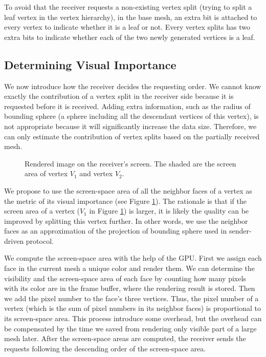      To avoid that the receiver requests a non-existing vertex split (trying to split
     a leaf vertex in the vertex hierarchy),
     in the base mesh, an extra bit is attached to every vertex to indicate whether it is a leaf or not.
     Every vertex splits has two extra bits to indicate whether each of the two newly generated vertices 
     is a leaf.
     \subsection{Determining Visual Importance}
     \label{ss:dstream:visual}
     We now introduce how the receiver decides the requesting order. 
     We cannot know exactly the contribution of a vertex split in the receiver side
     because it is requested before it is received.
     Adding extra information, such as the radius of bounding sphere (a sphere including all the 
     descendant vertices of this vertex), is not appropriate
     because it will significantly increase the data size. 
     Therefore, we can only estimate the contribution of vertex splits based on the 
     partially received mesh.
     
    \begin{figure}
    \centering
    \caption[Screen area]{Rendered image on the receiver's screen. 
    The shaded are the screen area of vertex $V_1$ and vertex $V_2$.
    \label{dstream:screen_area}}
    \end{figure}
     We propose to use the screen-space area of all the neighbor faces of a vertex as the 
     metric of its visual importance (see Figure \ref{dstream:screen_area}).
     The rationale is that if the screen area of a vertex ($V_1$ in Figure \ref{dstream:screen_area}) 
    is larger, it is likely the quality can be improved by splitting this vertex further. 
    In other words, we use the neighbor faces as an approximation of the projection of bounding sphere used
    in sender-driven protocol.
    
    We compute the screen-space area with the help of the GPU. 
    First we assign each face in the current mesh a unique color and render them. 
    We can determine the visibility
    and the screen-space area of each face by counting how many pixels with its color
    are in the frame buffer, where the rendering result is stored. 
    Then we add the pixel number to the face's three vertices. Thus, the
    pixel number of a vertex (which is the sum of pixel numbers in its neighbor faces)
    is proportional to its screen-space area.
    This process introduce some overhead, but the overhead can be compensated by the time
    we saved from rendering only visible part of a large mesh later. 
    After the screen-space areas are computed, 
    the receiver sends the requests following the descending order of the 
    screen-space area. 
    
